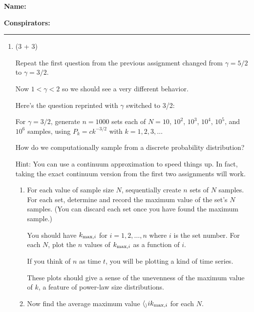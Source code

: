 \textbf{Name:} \\

\medskip

\textbf{Conspirators:} 

\medskip
\medskip

\hrule

\medskip


\begin{enumerate}

\item (3 + 3)

  Repeat the first question from the previous assignment
  changed from
  $\gamma = 5/2$ to $\gamma = 3/2$.

  Now $1 < \gamma < 2$ so
  we should see a very different behavior.


  Here's the question reprinted with $\gamma$ switched to 3/2:

  For $\gamma = 3/2$, generate $n=1000$ sets each of 
  $N=10$, $10^2$, $10^3$, $10^4$, $10^5$, and $10^6$ samples,
  using $P_k = c k^{-3/2}$ with $k=1, 2, 3, \ldots$ 

  How do we computationally sample from a discrete probability
  distribution? 

  Hint: You can use a continuum approximation to speed things up.
  In fact, taking the exact continuum version from the first two
  assignments will work.

  \begin{enumerate}
  \item 
    For each value of sample size $N$, sequentially create $n$ sets of $N$ samples.
    For each set,
    determine and record the maximum value of the set's $N$ samples.
    (You can discard each set once you have found the maximum sample.)

    You should have $k_{\textnormal{max},i}$ for $i=1, 2, \ldots, n$ where $i$
    is the set number.
    For each $N$, plot the $n$ values of $k_{\textnormal{max},i}$ as a function of $i$.

    If you think of $n$ as time $t$, you will be plotting a kind of time series.

    These plots should give a sense
    of the unevenness of the maximum value of $k$, 
    a feature of power-law size distributions.
    
  \item 
    Now find the average
    maximum value
    $\langle_\rangle{i}{k_{\textnormal{max},i}}$
    for each $N$.


\end{enumerate}
\end{enumerate}
